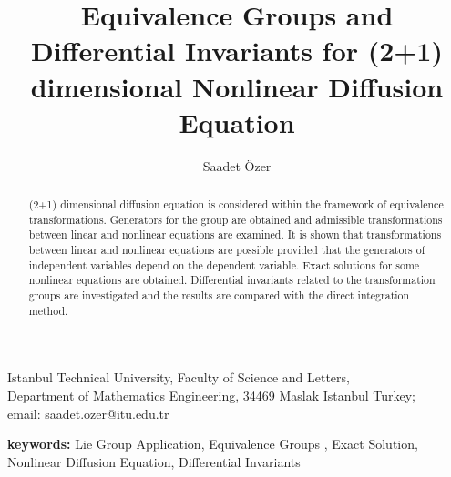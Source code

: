 \documentclass[a4paper]{article}
\date{}
\begin{document}
\title{Equivalence Groups and Differential Invariants for (2+1) dimensional Nonlinear Diffusion Equation}
\author{Saadet  \"Ozer }
\maketitle {} Istanbul Technical University, Faculty of Science and Letters,\\
Department of Mathematics Engineering, 34469 Maslak Istanbul
Turkey;\\
email: saadet.ozer@itu.edu.tr\\
\begin {abstract}
(2+1) dimensional
diffusion equation is considered within the framework of equivalence
transformations. Generators for the group are obtained and admissible transformations
between linear and nonlinear equations are examined. It is  shown that  transformations between  linear and  nonlinear equations are possible provided that the generators of independent variables depend on  the dependent variable.  Exact solutions for some nonlinear equations are obtained.
Differential invariants related to
the transformation groups are  investigated and the results are compared with the direct integration method.\\
\end{abstract}
{\bf keywords:}
Lie Group Application, Equivalence Groups , Exact Solution,  Nonlinear Diffusion Equation,  Differential Invariants
\end{document}
